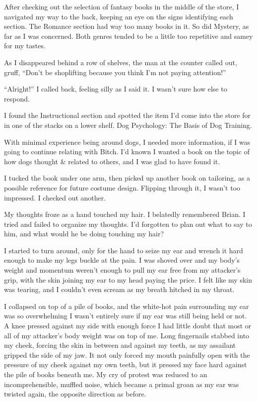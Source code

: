 After checking out the selection of fantasy books in the middle of the store, I navigated my way to the back, keeping an eye on the signs identifying each section.  The Romance section had way too many books in it.  So did Mystery, as far as I was concerned.  Both genres tended to be a little too repetitive and samey for my tastes.



As I disappeared behind a row of shelves, the man at the counter called out, gruff, ``Don't be shoplifting because you think I'm not paying attention!''



``Alright!'' I called back, feeling silly as I said it.  I wasn't sure how else to respond.



I found the Instructional section and spotted the item I'd come into the store for in one of the stacks on a lower shelf.  Dog Psychology: The Basis of Dog Training.



With minimal experience being around dogs, I needed more information, if I was going to continue relating with Bitch.  I'd known I wanted a book on the topic of how dogs thought & related to others, and I was glad to have found it.



I tucked the book under one arm, then picked up another book on tailoring, as a possible reference for future costume design.  Flipping through it, I wasn't too impressed.  I checked out another.



My thoughts froze as a hand touched my hair.  I belatedly remembered Brian.  I tried and failed to organize my thoughts.  I'd forgotten to plan out what to say to him, and what would he be doing touching my hair?



I started to turn around, only for the hand to seize my ear and wrench it hard enough to make my legs buckle at the pain.  I was shoved over and my body's weight and momentum weren't enough to pull my ear free from my attacker's grip, with the skin joining my ear to my head paying the price.  I felt like my skin was tearing, and I couldn't even scream as my breath hitched in my throat.



I collapsed on top of a pile of books, and the white-hot pain surrounding my ear was so overwhelming I wasn't entirely sure if my ear was still being held or not.  A knee pressed against my side with enough force I had little doubt that most or all of my attacker's body weight was on top of me.  Long fingernails stabbed into my cheek, forcing the skin in between and against my teeth, as my assailant gripped the side of my jaw.  It not only forced my mouth painfully open with the pressure of my cheek against my own teeth, but it pressed my face hard against the pile of books beneath me.   My cry of protest was reduced to an incomprehensible, muffled noise, which became a primal groan as my ear was twisted again, the opposite direction as before.



